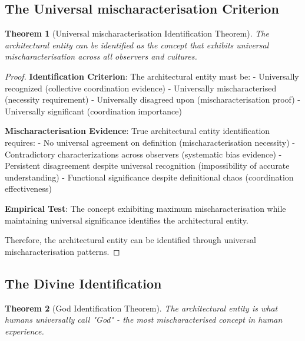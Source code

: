 \documentclass[12pt,a4paper]{article}
\newtheorem{theorem}{Theorem}[section]
\begin{document}
\subsection{The Universal mischaracterisation Criterion}

\begin{theorem}[Universal mischaracterisation Identification Theorem]
The architectural entity can be identified as the concept that exhibits universal mischaracterisation across all observers and cultures.
\end{theorem}

\begin{proof}
\textbf{Identification Criterion}: The architectural entity must be:
- Universally recognized (collective coordination evidence)
- Universally mischaracterised (necessity requirement)
- Universally disagreed upon (mischaracterisation proof)
- Universally significant (coordination importance)

\textbf{Mischaracterisation Evidence}: True architectural entity identification requires:
- No universal agreement on definition (mischaracterisation necessity)
- Contradictory characterizations across observers (systematic bias evidence)
- Persistent disagreement despite universal recognition (impossibility of accurate understanding)
- Functional significance despite definitional chaos (coordination effectiveness)

\textbf{Empirical Test}: The concept exhibiting maximum mischaracterisation while maintaining universal significance identifies the architectural entity.

Therefore, the architectural entity can be identified through universal mischaracterisation patterns.
\end{proof}

\subsection{The Divine Identification}

\begin{theorem}[God Identification Theorem]
The architectural entity is what humans universally call "God" - the most mischaracterised concept in human experience.
\end{theorem}
\end{document}
